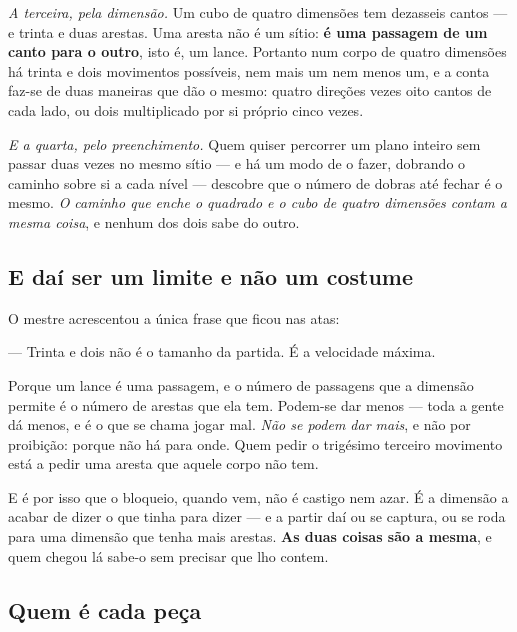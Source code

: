 \documentclass[livro.tex]{subfiles}
\begin{document}
\medskip

\emph{A terceira, pela dimensão.} Um cubo de quatro dimensões tem dezasseis cantos --- e trinta e
duas arestas. Uma aresta não é um sítio: \textbf{é uma passagem de um canto para o outro}, isto é,
um lance. Portanto num corpo de quatro dimensões há trinta e dois movimentos possíveis, nem mais um
nem menos um, e a conta faz-se de duas maneiras que dão o mesmo: quatro direções vezes oito
cantos de cada lado, ou dois multiplicado por si próprio cinco vezes.

\medskip

\emph{E a quarta, pelo preenchimento.} Quem quiser percorrer um plano inteiro sem passar duas vezes
no mesmo sítio --- e há um modo de o fazer, dobrando o caminho sobre si a cada nível --- descobre
que o número de dobras até fechar é o mesmo. \emph{O caminho que enche o quadrado e o cubo de
quatro dimensões contam a mesma coisa}, e nenhum dos dois sabe do outro.

\subsection*{E daí ser um limite e não um costume}

O mestre acrescentou a única frase que ficou nas atas:

\medskip

--- Trinta e dois não é o tamanho da partida. É a velocidade máxima.

\medskip

Porque um lance é uma passagem, e o número de passagens que a dimensão permite é o número de
arestas que ela tem. Podem-se dar menos --- toda a gente dá menos, e é o que se chama jogar mal.
\emph{Não se podem dar mais}, e não por proibição: porque não há para onde. Quem pedir o
trigésimo terceiro movimento está a pedir uma aresta que aquele corpo não tem.

\medskip

E é por isso que o bloqueio, quando vem, não é castigo nem azar. É a dimensão a acabar de dizer o
que tinha para dizer --- e a partir daí ou se captura, ou se roda para uma dimensão que tenha mais
arestas. \textbf{As duas coisas são a mesma}, e quem chegou lá sabe-o sem precisar que lho contem.



\subsection*{Quem é cada peça}
\end{document}
